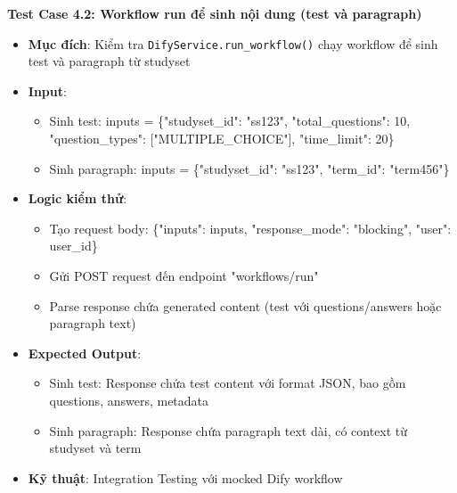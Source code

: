 \documentclass[../DoAn.tex]{subfiles}
\begin{document}
\textbf{Test Case 4.2: Workflow run để sinh nội dung (test và paragraph)}
\begin{itemize}
    \item \textbf{Mục đích}: Kiểm tra \texttt{DifyService.run\_workflow()} chạy workflow để sinh test và paragraph từ studyset
    \item \textbf{Input}: 
    \begin{itemize}
        \item Sinh test: inputs = \{"studyset\_id": "ss123", "total\_questions": 10, "question\_types": ["MULTIPLE\_CHOICE"], "time\_limit": 20\}
        \item Sinh paragraph: inputs = \{"studyset\_id": "ss123", "term\_id": "term456"\}
    \end{itemize}
    \item \textbf{Logic kiểm thử}: 
    \begin{itemize}
        \item Tạo request body: \{"inputs": inputs, "response\_mode": "blocking", "user": user\_id\}
        \item Gửi POST request đến endpoint "workflows/run"
        \item Parse response chứa generated content (test với questions/answers hoặc paragraph text)
    \end{itemize}
    \item \textbf{Expected Output}: 
    \begin{itemize}
        \item Sinh test: Response chứa test content với format JSON, bao gồm questions, answers, metadata
        \item Sinh paragraph: Response chứa paragraph text dài, có context từ studyset và term
    \end{itemize}
    \item \textbf{Kỹ thuật}: Integration Testing với mocked Dify workflow
\end{itemize}
\end{document}
